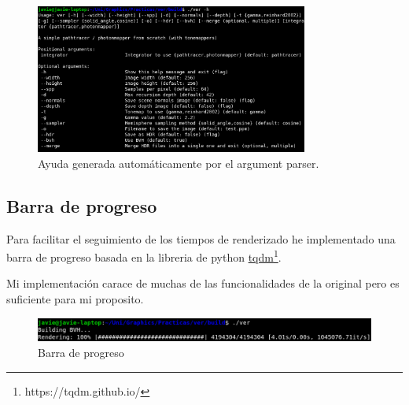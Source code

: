\documentclass{article}
\begin{document}
\begin{figure}[h]
  \centering \includegraphics[width=0.8\textwidth]{imgs/args.png}
  \caption{Ayuda generada automáticamente por el argument parser.}
\end{figure}

\subsection{Barra de progreso}
Para facilitar el seguimiento de los tiempos de renderizado he implementado una
barra de progreso basada en la libreria de python
\href{https://tqdm.github.io/}{tqdm}\footnote{https://tqdm.github.io/}.

Mi implementación carace de muchas de las funcionalidades de la original pero es
suficiente para mi proposito.

\begin{figure}[h]
  \centering \includegraphics[width=1\textwidth]{imgs/lwpb.png}
  \caption{Barra de progreso}
\end{figure}

\medskip

\printbibliography
\end{document}
